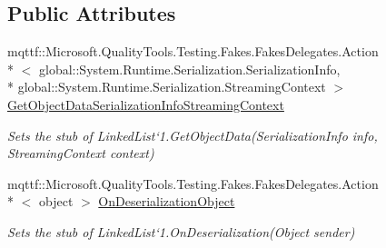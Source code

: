 \subsection*{Public Attributes}
\begin{DoxyCompactItemize}
\item 
mqttf\-::\-Microsoft.\-Quality\-Tools.\-Testing.\-Fakes.\-Fakes\-Delegates.\-Action\\*
$<$ global\-::\-System.\-Runtime.\-Serialization.\-Serialization\-Info, \\*
global\-::\-System.\-Runtime.\-Serialization.\-Streaming\-Context $>$ \hyperlink{class_system_1_1_collections_1_1_generic_1_1_fakes_1_1_stub_linked_list_3_01_t_01_4_a6e473bc7e15682d562b6be39ca6ba1cc}{Get\-Object\-Data\-Serialization\-Info\-Streaming\-Context}
\begin{DoxyCompactList}\small\item\em Sets the stub of Linked\-List`1.Get\-Object\-Data(\-Serialization\-Info info, Streaming\-Context context)\end{DoxyCompactList}\item 
mqttf\-::\-Microsoft.\-Quality\-Tools.\-Testing.\-Fakes.\-Fakes\-Delegates.\-Action\\*
$<$ object $>$ \hyperlink{class_system_1_1_collections_1_1_generic_1_1_fakes_1_1_stub_linked_list_3_01_t_01_4_afcbd7329cb628ad5e59a1f3440332990}{On\-Deserialization\-Object}
\begin{DoxyCompactList}\small\item\em Sets the stub of Linked\-List`1.On\-Deserialization(\-Object sender)\end{DoxyCompactList}\end{DoxyCompactItemize}

